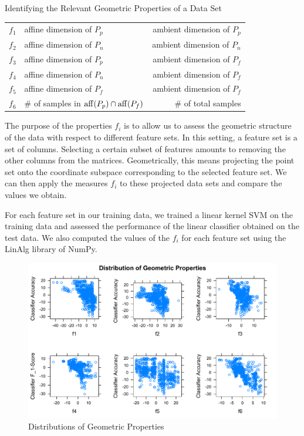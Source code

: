 \documentclass{llncs}
\begin{document}
\begin{section}{Identifying the Relevant Geometric Properties of a Data Set}
\begin{table}[ht]
\begin{tabular}{l l r }
$f_1$&affine dimension of $P_p$& ambient dimension of $P_p$\\
$f_2$&affine dimension of $P_n$& ambient dimension of $P_n$\\
$f_3$&affine dimension of $P_p$& ambient dimension of $P_f$\\
$f_4$&affine dimension of $P_n$& ambient dimension of $P_f$\\
$f_5$&affine dimension of $P_f$& ambient dimension of $P_f$\\
$f_6$&\# of samples in $\operatorname{aff}(P_p)\cap\operatorname{aff}(P_f)$\;\;\;\;\;   &\# of total samples\\
\hline
\end{tabular}
\label{tab:formulas}
\end{table}

The purpose of the properties $f_i$ is to allow us to assess the geometric structure of the data with respect to different feature sets. In this setting, a feature set is a set of columns. Selecting a certain subset of features amounts to removing the other columns from the matrices. Geometrically, this means projecting the point set onto the coordinate subspace corresponding to the selected feature set. We can then apply the measures $f_i$ to these projected data sets and compare the values we obtain.

For each feature set in our training data, we trained a linear kernel SVM on the training data and assessed the performance of the linear classifier obtained on the test data. We also computed the values of the $f_i$ for each feature set using the LinAlg library of NumPy\cite{numpy}.  
\begin{figure}[ht]
\begin{center}
\includegraphics[scale = .5]{figures/conf_fig}
\caption{Distributions of Geometric Properties}
\label{fig:AllProps}
\end{center}
\end{figure}


\end{section}
\end{document}
